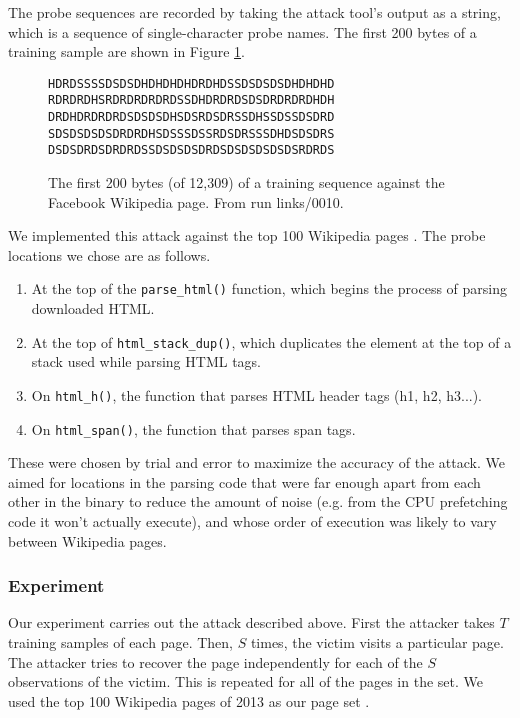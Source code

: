 \documentclass[letterpaper,twocolumn,10pt]{article}
\begin{document}
The probe sequences are recorded by taking the attack tool's output as a string,
which is a sequence of single-character probe names. The first 200 bytes of
a training sample are shown in Figure \ref{figure:probetext}.

\begin{figure}
    \centering
\begin{verbatim}
HDRDSSSSDSDSDHDHDHDHDRDHDSSDSDSDSDHDHDHD
RDRDRDHSRDRDRDRDRDSSDHDRDRDSDSDRDRDRDHDH
DRDHDRDRDRDSDSDSDHSDSRDSDRSSDHSSDSSDSDRD
SDSDSDSDSDRDRDHSDSSSDSSRDSDRSSSDHDSDSDRS
DSDSDRDSDRDRDSSDSDSDSDRDSDSDSDSDSDSRDRDS
\end{verbatim}
\caption{The first 200 bytes (of 12,309) of a training sequence against the
Facebook Wikipedia page. From run links/0010.}
    \label{figure:probetext}
\end{figure}

We implemented this attack against the top 100 Wikipedia pages
\cite{wikitop2013}. The probe locations we chose are as follows.

\begin{enumerate}
    \item At the top of the \texttt{parse\_html()} function, which begins the
        process of parsing downloaded HTML.
    \item At the top of \texttt{html\_stack\_dup()}, which duplicates the element
        at the top of a stack used while parsing HTML tags.
    \item On \texttt{html\_h()}, the function that parses HTML header tags (h1,
        h2, h3...).
    \item On \texttt{html\_span()}, the function that parses span tags.
\end{enumerate}

These were chosen by trial and error to maximize the accuracy of the attack. We
aimed for locations in the parsing code that were far enough apart from each
other in the binary to reduce the amount of noise (e.g. from the CPU prefetching
code it won't actually execute), and whose order of execution was likely to vary
between Wikipedia pages.

\subsubsection{Experiment}

Our experiment carries out the attack described above. First the attacker takes
$T$ training samples of each page. Then, $S$ times, the victim visits
a particular page. The attacker tries to recover the page independently for each
of the $S$ observations of the victim. This is repeated for all of the pages in
the set. We used the top 100 Wikipedia pages of 2013 as our page set
\cite{wikitop2013}.
\end{document}
